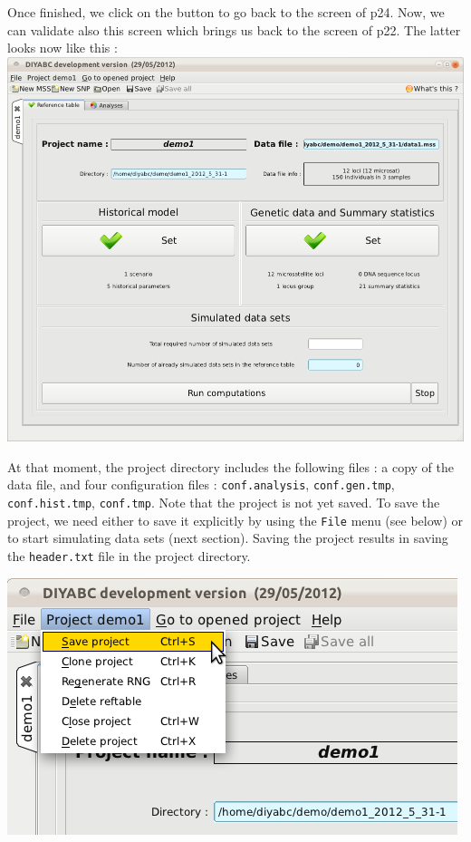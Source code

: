 Once finished, we click on the  button to go back to the screen of p24. Now, we can validate also this screen which brings us back to the screen of p22. The latter looks now like this : \\

\includegraphics[scale=0.35]{gui_pictures/Capture-DIYABC-22.png} 

At that moment, the project directory includes the following files : a copy of the data file, and four configuration files : \texttt{conf.analysis}, \texttt{conf.gen.tmp}, \texttt{conf.hist.tmp}, \texttt{conf.tmp}. Note that the project is not yet saved. To save the project, we need either to save it explicitly by using the \texttt{File} menu (see below) or to start simulating data sets (next section). Saving the project results in saving the \texttt{header.txt} file in the project directory.


\includegraphics[scale=0.35]{gui_pictures/Capture-DIYABC-23.png} 

